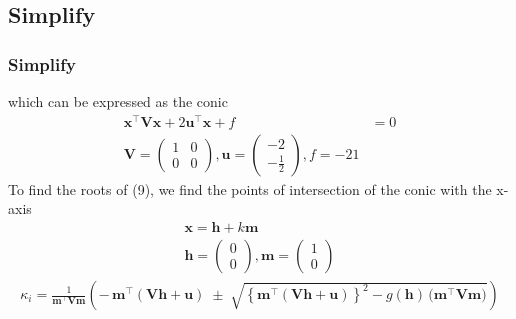 \documentclass{beamer}
\providecommand{\brak}[1]{\ensuremath{\left(#1\right)}}
\providecommand{\cbrak}[1]{\ensuremath{\left\{#1\right\}}}
\theoremstyle{remark}
\newcommand{\myvec}[1]{\ensuremath{\begin{pmatrix}#1\end{pmatrix}}}
\let\vec\mathbf
\numberwithin{equation}{section}
\begin{document}
\subsection{Simplify}
\begin{frame}
\frametitle{Simplify}
 which can be expressed as the conic
  \begin{align}
       \vec{x}^\top\vec{V}\vec{x} + 2\vec{u}^\top\vec{x} + f &= 0 \\
       \vec{V}=\myvec{1 & 0 \\ 0&0},\vec{u}=\myvec{-2\\-\frac{1}{2}},f=-21
  \end{align}
   To find the roots of (9), we find the points of intersection of the conic with
the x-axis
\begin{align}
\vec{x}=\vec{h}+k\vec{m}\\
\vec{h}=\myvec{0\\0},\vec{m}=\myvec{1\\0}
\end{align}
\begin{align}
\kappa_i= \frac{1}{\vec{m}^\top \vec{V}\vec{m}}\brak{
       -\,\vec{m}^\top\brak{\vec{V}\vec{h}+\vec{u}}
       \;\pm\;
       \sqrt{ \cbrak{\vec{m}^\top(\vec{V}\vec{h}+\vec{u})}^2
       - g(\vec{h})\,\big(\vec{m}^\top \vec{V}\vec{m}\big)}
     }
\end{align}
 \end{frame}
\end{document}
